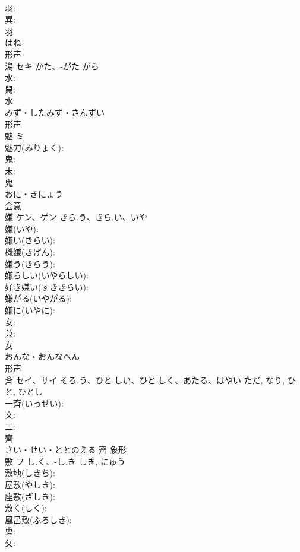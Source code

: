 \documentclass[8pt]{extreport}
\begin{document}
\begin{CJK}{UTF8}{min}
\\	羽: 
\\	異: 
\\	羽	
\\	はね	
\\	形声 
\\	潟	セキ	かた、-がた	がら	
\\	水: 
\\	舄: 
\\	水	
\\	みず・したみず・さんずい	
\\	形声 
\\	魅	ミ			
\\	魅力(みりょく): 
\\	鬼: 
\\	未: 
\\	鬼	
\\	おに・きにょう	
\\	会意 
\\	嫌	ケン、ゲン	きら.う、きら.い、いや		
\\	嫌(いや): 
\\	嫌い(きらい): 
\\	機嫌(きげん): 
\\	嫌う(きらう): 
\\	嫌らしい(いやらしい): 
\\	好き嫌い(すききらい): 
\\	嫌がる(いやがる): 
\\	嫌に(いやに): 
\\	女: 
\\	兼: 
\\	女	
\\	おんな・おんなへん	
\\	形声 
\\	斉	セイ、サイ	そろ.う、ひと.しい、ひと.しく、あたる、はやい	ただ, なり, ひと, ひとし	
\\	一斉(いっせい): 
\\	文: 
\\	二: 
\\	齊	
\\	さい・せい・ととのえる	齊	象形 
\\	敷	フ	し.く、-し.き	しき, にゅう	
\\	敷地(しきち): 
\\	屋敷(やしき): 
\\	座敷(ざしき): 
\\	敷く(しく): 
\\	風呂敷(ふろしき): 
\\	旉: 
\\	攵: 

\end{CJK}
\end{document}
